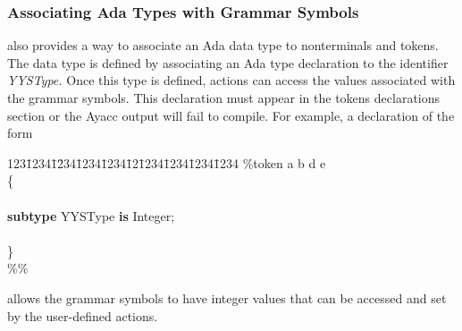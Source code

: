\subsubsection{Associating Ada Types with Grammar Symbols}

\ayacc also provides a way to associate an Ada data type
to nonterminals and tokens.  The data type is
defined by associating an Ada type declaration to the identifier
{\it YYSType.}
Once this type is defined, actions can access the values associated with
the grammar symbols.  This declaration must appear in the tokens
declarations section or the Ayacc output will fail to compile.  For
example, a declaration of the form

\begin{tabbing}
123\=1234\=1\=234\=1234\=1234\=12\=1234\=1234\=1234\=1234 \kill
\%token a b d e\\
\{\\
\\
\>  {\bf subtype} YYSType {\bf is} Integer;\\
\\
\}\\
\%\%
\end{tabbing}

\noindent allows the grammar symbols to have integer values
that can be accessed and set by the user-defined actions.

